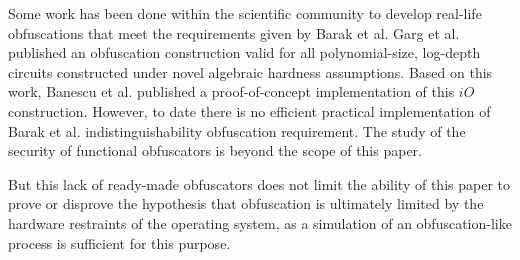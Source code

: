 Some work has been done within the scientific community to develop real-life obfuscations that meet the requirements given by Barak et al. Garg et al.\cite{garg} published an obfuscation construction valid for all polynomial-size, log-depth circuits constructed under novel algebraic hardness assumptions. Based on this work, Banescu et al.\cite{tum} published a proof-of-concept implementation of this $iO$ construction.
However, to date there is no efficient practical implementation of Barak et al.\cite{barak} indistinguishability obfuscation requirement. The study of the security of functional obfuscators is beyond the scope of this paper.
\par
But this lack of ready-made obfuscators does not limit the ability of this paper to prove or disprove the hypothesis that obfuscation is ultimately limited by the hardware restraints of the operating system, as a simulation of an obfuscation-like process is sufficient for this purpose.


